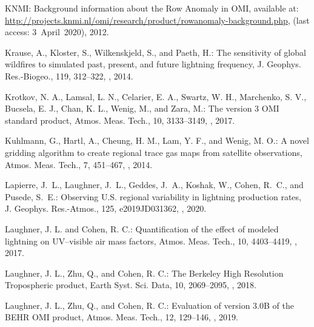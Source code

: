 \documentclass[amt]{copernicus}
\begin{document}
\begin{thebibliography}{105}
KNMI: Background information about the Row Anomaly in OMI,
 available at: \url{http://projects.knmi.nl/omi/research/product/rowanomaly-background.php},
  (last access: 3~April~2020), 2012.

Krause, A., Kloster, S., Wilkenskjeld, S., and Paeth, H.: The sensitivity of
  global wildfires to simulated past, present, and future lightning frequency,
  J. Geophys. Res.-Biogeo., 119, 312--322,
  , 2014.

Krotkov, N. A., Lamsal, L. N., Celarier, E. A., Swartz, W. H., Marchenko, S. V., Bucsela, E. J., Chan, K. L., Wenig, M., and Zara, M.: The version 3 OMI  standard product, Atmos. Meas. Tech., 10, 3133–3149, , 2017.

 Kuhlmann, G., Hartl, A., Cheung, H. M., Lam, Y. F., and Wenig, M. O.: A novel gridding algorithm to create regional trace gas maps from satellite observations, Atmos. Meas. Tech., 7, 451–467, , 2014.

Lapierre, J.~L., Laughner, J.~L., Geddes, J.~A., Koshak, W., Cohen, R.~C., and
  Pusede, S.~E.: Observing U.S. regional variability in lightning
   production rates, J. Geophys. Res.-Atmos., 125, e2019JD031362, , 2020.

Laughner, J. L. and Cohen, R. C.: Quantification of the effect of modeled lightning  on UV–visible air mass factors, Atmos. Meas. Tech., 10, 4403–4419, , 2017.

 Laughner, J. L., Zhu, Q., and Cohen, R. C.: The Berkeley High Resolution Tropospheric  product, Earth Syst. Sci. Data, 10, 2069–2095, ,  2018.

Laughner, J. L., Zhu, Q., and Cohen, R. C.: Evaluation of version 3.0B of the BEHR OMI  product, Atmos. Meas. Tech., 12, 129–146, , 2019.




\end{thebibliography}
\end{document}
